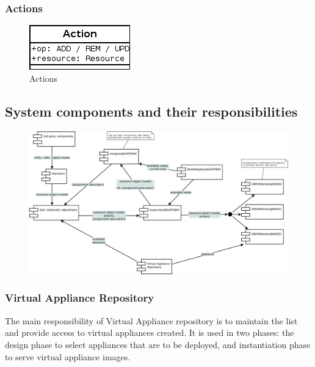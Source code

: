 \documentclass[11pt]{book}
\begin{document}
        \subsubsection{Actions}

          \begin{figure}[H]
            \begin{center}
              \includegraphics{img/architecture/actions.png}
            \end{center}

            \caption{Actions}
          \end{figure}


      \subsection{System components and their responsibilities}


        \begin{figure}[H]
          \begin{center}
            \includegraphics[width=\textwidth]{img/architecture/iaas-components.pdf}
          \end{center}
        \end{figure}


        \subsubsection{Virtual Appliance Repository}

          The main responsibility of Virtual Appliance repository is to maintain the list and provide access to virtual
          appliances created. It is used in two phases: the design phase to select appliances that are to be deployed,
          and instantiation phase to serve virtual appliance images. \\
\end{document}

